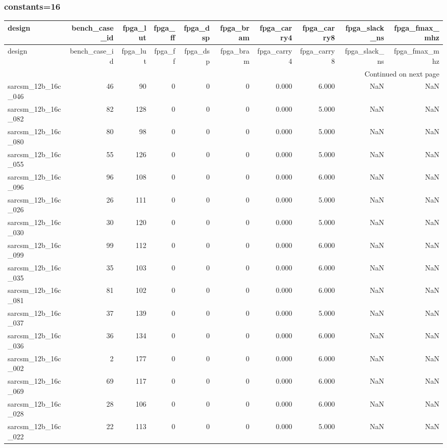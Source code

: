 \documentclass{article}
\begin{document}
\subsubsection*{constants=16}
\begin{longtable}{lrrrrrrrrr}
\toprule
design & bench\_case\_id & fpga\_lut & fpga\_ff & fpga\_dsp & fpga\_bram & fpga\_carry4 & fpga\_carry8 & fpga\_slack\_ns & fpga\_fmax\_mhz \\
\midrule
\endfirsthead
\toprule
design & bench\_case\_id & fpga\_lut & fpga\_ff & fpga\_dsp & fpga\_bram & fpga\_carry4 & fpga\_carry8 & fpga\_slack\_ns & fpga\_fmax\_mhz \\
\midrule
\endhead
\midrule
\multicolumn{10}{r}{Continued on next page} \\
\midrule
\endfoot
\bottomrule
\endlastfoot
sarcsm\_12b\_16c\_046 & 46 & 90 & 0 & 0 & 0 & 0.000 & 6.000 & NaN & NaN \\
sarcsm\_12b\_16c\_082 & 82 & 128 & 0 & 0 & 0 & 0.000 & 5.000 & NaN & NaN \\
sarcsm\_12b\_16c\_080 & 80 & 98 & 0 & 0 & 0 & 0.000 & 5.000 & NaN & NaN \\
sarcsm\_12b\_16c\_055 & 55 & 126 & 0 & 0 & 0 & 0.000 & 5.000 & NaN & NaN \\
sarcsm\_12b\_16c\_096 & 96 & 108 & 0 & 0 & 0 & 0.000 & 6.000 & NaN & NaN \\
sarcsm\_12b\_16c\_026 & 26 & 111 & 0 & 0 & 0 & 0.000 & 5.000 & NaN & NaN \\
sarcsm\_12b\_16c\_030 & 30 & 120 & 0 & 0 & 0 & 0.000 & 5.000 & NaN & NaN \\
sarcsm\_12b\_16c\_099 & 99 & 112 & 0 & 0 & 0 & 0.000 & 6.000 & NaN & NaN \\
sarcsm\_12b\_16c\_035 & 35 & 103 & 0 & 0 & 0 & 0.000 & 6.000 & NaN & NaN \\
sarcsm\_12b\_16c\_081 & 81 & 102 & 0 & 0 & 0 & 0.000 & 6.000 & NaN & NaN \\
sarcsm\_12b\_16c\_037 & 37 & 139 & 0 & 0 & 0 & 0.000 & 5.000 & NaN & NaN \\
sarcsm\_12b\_16c\_036 & 36 & 134 & 0 & 0 & 0 & 0.000 & 6.000 & NaN & NaN \\
sarcsm\_12b\_16c\_002 & 2 & 177 & 0 & 0 & 0 & 0.000 & 6.000 & NaN & NaN \\
sarcsm\_12b\_16c\_069 & 69 & 117 & 0 & 0 & 0 & 0.000 & 6.000 & NaN & NaN \\
sarcsm\_12b\_16c\_028 & 28 & 106 & 0 & 0 & 0 & 0.000 & 6.000 & NaN & NaN \\
sarcsm\_12b\_16c\_022 & 22 & 113 & 0 & 0 & 0 & 0.000 & 5.000 & NaN & NaN \\

\end{longtable}
\end{document}
